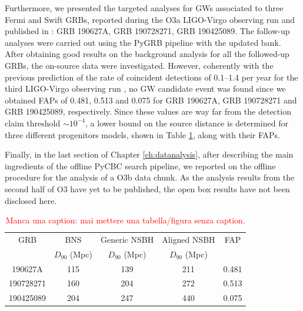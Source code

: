 \documentclass[binding=0.6cm, LaM]{sapthesis}
\newcommand{\fpg}[1]{\textcolor{red}{#1} }
\begin{document}
	Furthermore, we presented the targeted analyses for GWs associated to three Fermi and Swift GRBs, 
	reported during the O3a LIGO-Virgo observing run and published in \cite{43}: 
	GRB 190627A, GRB 190728271, GRB 190425089.
	The follow-up analyses were carried out using the {\ttfamily PyGRB} pipeline with the updated bank.
	After obtaining good results on the background analysis for all the followed-up GRBs, 
	the on-source data were investigated.
	However, coherently with the previous prediction of the rate of coincident detections of 0.1--1.4 per year 
	for the third LIGO-Virgo observing run \cite{55}, no GW candidate event was found since 
	we obtained FAPs of 0.481, 0.513 and 0.075 for GRB 190627A, GRB 190728271 and GRB 190425089, respectively. 
	Since these values are way far from the detection claim threshold $\sim 10^{-4}$,
	a lower bound on the source distance is determined for three different progenitors models,
	shown in Table \ref{table:1}, along with their FAPs.

	Finally, in the last section of Chapter \ref{ch:datanalysis}, 
	after describing the main ingredients of the offline PyCBC search pipeline,
	we reported on the offline procedure for the analysis of a O3b data chunk.
	As the analysis results from the second half of O3 have yet to be published, 
	the open box results have not been disclosed here.
	
	
	
\begin{table}[!t]
\centering
\begin{tabular}{ccccc}
\toprule[1.3pt]
\toprule[1.3pt]
GRB & BNS           & Generic NSBH   & Aligned NSBH  & FAP \\
    & $D_{90}$ (Mpc) & $D_{90}$ (Mpc) & $D_{90}$ (Mpc) & \\
\midrule[1.1pt]
190627A   & 115 & 139 & 211 & 0.481\\
190728271 & 160 & 204 & 272 & 0.513\\
190425089 & 204 & 247 & 440 & 0.075\\
\bottomrule[1.3pt]
\bottomrule[1.3pt]
\end{tabular}
\caption{\fpg{Manca una caption: mai mettere una tabella/figura senza caption.}}
\label{table:1}
\end{table}

\backmatter
\cleardoublepage




\end{document}
